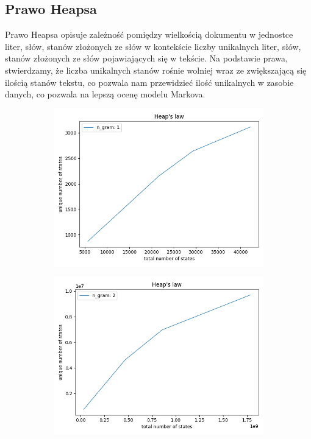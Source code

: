 \documentclass{article}
\begin{document}
\subsection{Prawo Heapsa}
Prawo Heapsa opisuje zależność pomiędzy wielkością dokumentu w jednostce liter, słów, stanów złożonych ze słów w kontekście liczby unikalnych liter, słów, stanów złożonych ze słów pojawiających się w tekście. Na podstawie prawa, stwierdzamy, że liczba unikalnych stanów rośnie wolniej wraz ze zwiększającą się ilością stanów tekstu, co pozwala nam przewidzieć ilość unikalnych w zasobie danych, co pozwala na lepszą ocenę modelu Markova.
\begin{figure}
     \centering
     \begin{subfigure}[b]{0.49\textwidth}
         \centering
         \includegraphics[width=\textwidth]{heaps1}
         \label{fig:mesh1}
     \end{subfigure}
     \hfill
     \begin{subfigure}[b]{0.49\textwidth}
         \centering
         \includegraphics[width=\textwidth]{heaps2}

\end{subfigure}
\end{figure}
\end{document}
